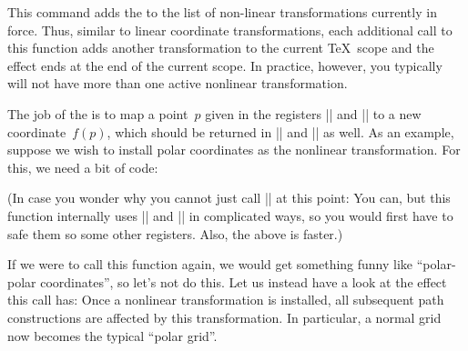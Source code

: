 \begin{command}{\pgftransformnonlinear{}}
    This command adds the  to the list of non-linear
    transformations currently in force. Thus, similar to linear coordinate
    transformations, each additional call to this function adds another
    transformation to the current \TeX\ scope and the effect ends at the end of
    the current scope. In practice, however, you typically will not have more
    than one active nonlinear transformation.

    The job of the  is to map a point~$p$ given in
    the registers |\pgf@x| and |\pgf@y| to a new coordinate~$f(p)$, which
    should be returned in |\pgf@x| and |\pgf@y| as well. As an example, suppose
    we wish to install polar coordinates as the nonlinear transformation. For
    this, we need a bit of code:
\begin{codeexample}
\def\polartransformation{%
  \pgfmathsincos@{\pgf@sys@tonumber\pgf@x}%
  \pgf@x=\pgfmathresultx\pgf@y%
  \pgf@y=\pgfmathresulty\pgf@y%
}
\end{codeexample}
    (In case you wonder why you cannot just call |\pgfpointpolar| at this
    point: You can, but this function internally uses |\pgf@x| and |\pgf@y| in
    complicated ways, so you would first have to safe them so some other
    registers. Also, the above is faster.)

    If we were to call this function again, we would get something funny like
    ``polar-polar coordinates'', so let's not do this. Let us instead have a
    look at the effect this call has: Once a nonlinear transformation is
    installed, all subsequent path constructions are affected by this
    transformation. In particular, a normal grid now becomes the typical
    ``polar grid''.
\begin{codeexample}[preamble={\usepgfmodule{nonlineartransformations}}]
\end{codeexample}
\end{command}


